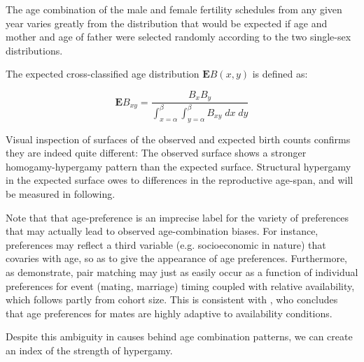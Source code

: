 
The age combination of the male and female fertility schedules from
any given year varies greatly from the distribution that would be expected if
age and mother and age of father were selected randomly according to the two
single-sex distributions.

The expected cross-classified age distribution $\textbf{E}B(x,y)$ is defined as:

\begin{equation}
\textbf{E}B_{xy} = \frac{B_x B_y}{\int _{x = \alpha} ^\beta \int _{y = \alpha}
^\beta B_{xy} \; dx \;dy}
\end{equation}

Visual inspection of surfaces of the observed and expected birth counts
confirms they are indeed quite different: The observed surface shows a stronger
homogamy-hypergamy pattern than the expected surface. Structural hypergamy in
the expected surface owes to differences in the reproductive age-span, and will
be measured in following.

Note that that age-preference is an imprecise label for the variety
of preferences that may actually lead to observed age-combination biases. For
instance, preferences may reflect a third variable (e.g. socioeconomic
in nature) that covaries with age, so as to give the appearance of age
preferences. Furthermore, as \citet{bergstrom1989effects, bergstrom1994sweden}
demonstrate, pair matching may just as easily occur as a function of individual
preferences for event (mating, marriage) timing coupled with relative
availability, which follows partly from cohort size. This is consistent with
\citet{bhrolchain2001flexibility}, who concludes that age preferences for
mates are highly adaptive to availability conditions.

Despite this ambiguity in causes behind age combination patterns, we can create an 
index of the strength of hypergamy. 






